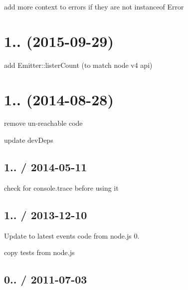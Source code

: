 
\begin{DoxyItemize}
\item add more context to errors if they are not instanceof Error
\end{DoxyItemize}

\section*{1.. (2015-\/09-\/29)}


\begin{DoxyItemize}
\item add Emitter\+::lister\+Count (to match node v4 api)
\end{DoxyItemize}

\section*{1.. (2014-\/08-\/28)}


\begin{DoxyItemize}
\item remove un-\/reachable code
\item update dev\+Deps
\end{DoxyItemize}

\subsection*{1.. / 2014-\/05-\/11}


\begin{DoxyItemize}
\item check for console.\+trace before using it
\end{DoxyItemize}

\subsection*{1.. / 2013-\/12-\/10}


\begin{DoxyItemize}
\item Update to latest events code from node.\+js 0.
\item copy tests from node.\+js
\end{DoxyItemize}

\subsection*{0.. / 2011-\/07-\/03}


